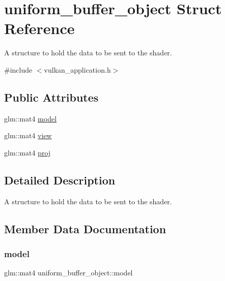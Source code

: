 \hypertarget{structuniform__buffer__object}{}\section{uniform\+\_\+buffer\+\_\+object Struct Reference}
\label{structuniform__buffer__object}


A structure to hold the data to be sent to the shader.  




{\ttfamily \#include $<$vulkan\+\_\+application.\+h$>$}

\subsection*{Public Attributes}
\begin{DoxyCompactItemize}
\item 
glm\+::mat4 \mbox{\hyperlink{structuniform__buffer__object_a599b79a2822bc18537ec9af8f3a48256}{model}}
\item 
glm\+::mat4 \mbox{\hyperlink{structuniform__buffer__object_abe6dc585a59bf2e22afc19bae9e4d478}{view}}
\item 
glm\+::mat4 \mbox{\hyperlink{structuniform__buffer__object_a92ef1d632442b62d88415f34d9f33ec0}{proj}}
\end{DoxyCompactItemize}


\subsection{Detailed Description}
A structure to hold the data to be sent to the shader. 

\subsection{Member Data Documentation}
\mbox{\label{structuniform__buffer__object_a599b79a2822bc18537ec9af8f3a48256}} 
\subsubsection{\texorpdfstring{model}{model}}
{\footnotesize\ttfamily glm\+::mat4 uniform\+\_\+buffer\+\_\+object\+::model}

